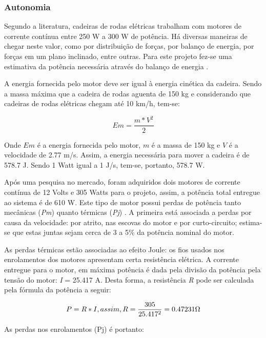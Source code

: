   \subsubsection{Autonomia}

  Segundo a literatura, cadeiras de rodas elétricas trabalham com motores de corrente contínua entre 250 W a 300 W de potência. Há diversas maneiras de chegar neste valor, como por distribuição de forças, por balanço de energia, por forças em um plano inclinado, entre outras. Para este projeto fez-se uma estimativa da potência necessária através do balanço de energia \cite{acionamento_motores_cadeira}.

  A energia fornecida pelo motor deve ser igual à energia cinética da cadeira. Sendo a massa máxima que a cadeira de rodas aguenta de 150 kg e considerando que cadeiras de rodas elétricas chegam até 10 km/h, tem-se:


  \begin{equation}
    Em = \frac{m*V^2}{2}
  \end{equation}

  Onde $Em$ é a energia fornecida pelo motor, $m$ é a massa de 150 kg e $V$ é a velocidade de 2.77 m/s. Assim, a energia necessária para mover a cadeira é de 578.7 J. Sendo 1 Watt igual a 1 J/s, tem-se, portanto, 578.7 W.

  Após uma pesquisa no mercado, foram adquiridos dois motores de corrente contínua de 12 Volts e 305 Watts para o projeto, assim, a potência total entregue ao sistema é de 610 W. Este tipo de motor possui perdas de potência tanto mecânicas (\textit{Pm}) quanto térmicas (\textit{Pj}) \cite{perdas}. A primeira está associada a perdas por causa da velocidade: por atrito, nas escovas do motor e por curto-circuito; estima-se que estas juntas sejam cerca de 3 a 5\% da potência nominal do motor.

  As perdas térmicas estão associadas ao efeito Joule: os fios usados nos enrolamentos dos motores apresentam certa resistência elétrica. A corrente entregue para o motor, em máxima potência é dada pela divisão da potência pela tensão do motor: \textit{I} = 25.417 A. Desta forma, a resistência \textit{R} pode ser calculada pela fórmula da potência a seguir:

  \begin{equation}
  P = R*I, assim, R = \frac{305}{25.417^2} = 0.47231 \ohm
  \end{equation}

  As perdas nos enrolamentos (Pj) é portanto:

